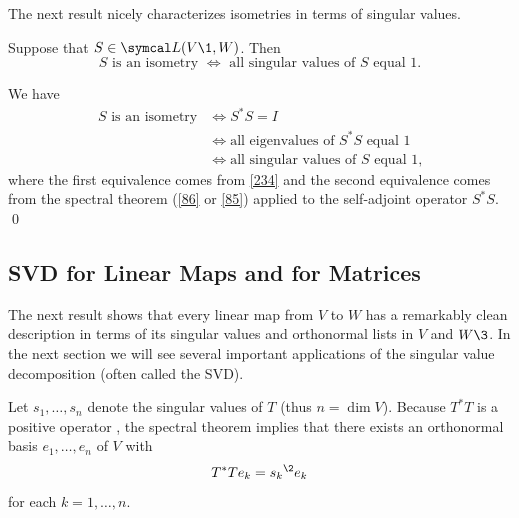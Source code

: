 \smallskip

The next result nicely characterizes isometries in terms of singular values.

{Suppose that $S \in \L(V\1, W)$. Then
\[
\mbox{$S$ is an isometry $\iff$ all singular values of $S$ equal $1$.}
\]}

\proof
We have
\begin{align*}
\text{$S$ is an isometry} &\iff S^* S = I \\
&\iff \text{all eigenvalues of $S^* S$ equal $1$} \\
&\iff \text{all singular values of $S$ equal~$1$,}
\end{align*}
where the first equivalence comes from \ref{234} and the second equivalence comes from
the spectral theorem (\ref{86} or \ref{85}) applied to the self-adjoint operator $S^* S$.
\qed

\pagebreak[3]

\subsection{SVD for Linear Maps and for Matrices}


The next result shows that every linear map from $V$ to $W$ has a remarkably clean description in terms of its singular values and orthonormal lists in $V$ and $W\3$. In the next section we will see several important applications of the singular value decomposition (often called the SVD).

\medskip


\proof
Let $s_1, \ldots, s_n$ denote the singular values of $T$ (thus $n = \dim V$). Because $T^*T$ is a positive operator
, the spectral theorem implies that there exists an orthonormal basis $e_1, \ldots, e_n$ of $V$ with
\begin{equation} \label{6sing}
T^*T e_k = {s_k}^{\2} e_k
\end{equation}%
for each $k = 1, \ldots, n$.

